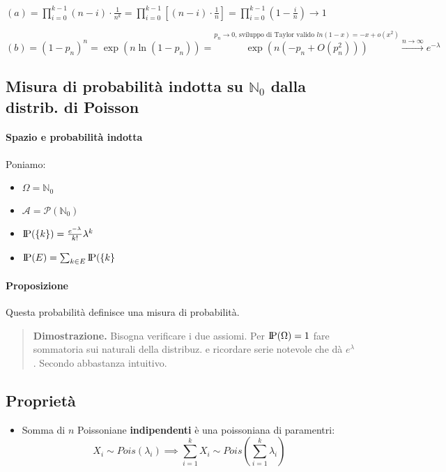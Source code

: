\documentclass[a4paper,10pt]{article}
\newcommand{\pr}{\text{I\kern-0.15em P}} %
\theoremstyle{remark}
\theoremstyle{definition}
\newenvironment{dimo}{\begin{quote}\textbf{Dimostrazione.}}{\end{quote}} %
\begin{document}
$(a)=\prod_{i=0}^{k-1}(n-i) \cdot \frac{1}{n^k}=\prod_{i=0}^{k-1}[(n-i) \cdot \frac{1}{n}]=\prod_{i=0}^{k-1}\left(1-\frac{i}{n}\right)\rightarrow1$

$(b)=\left(1-p_{n}\right)^{n}=\exp\left(n\ln\left(1-p_{n}\right)\right)=\overset{\text{$p_{n}\rightarrow0$, sviluppo di Taylor valido $ln(1-x)=-x+o(x^2)$}}{\exp\left(n\left(-p_{n}+O\left(p_{n}^{2}\right)\right)\right)}\overset{n\rightarrow\infty}{\longrightarrow}e^{-\lambda}$

\subsection*{Misura di probabilità indotta su $\mathbb{N}_0$ dalla distrib. di Poisson}
\paragraph*{Spazio e probabilità indotta}
Poniamo: 
\begin{itemize}
    \item $\Omega=\mathbb{N}_0$
    \item $\mathcal{A}=\mathcal{P}(\mathbb{N}_0)$
    \item $\pr(\{k\})=\frac{e^{-\lambda}}{k!}\lambda^k$    
    \item $\pr(E)=\sum_{k\in E}\pr(\{k\}$
\end{itemize}

\paragraph*{Proposizione} Questa probabilità definisce una misura di probabilità.

\begin{dimo} Bisogna verificare i due assiomi. Per $\pr(\Omega)=1$ fare sommatoria sui naturali della distribuz. e ricordare serie notevole che dà $e^\lambda$. Secondo abbastanza intuitivo.
    
\end{dimo}


\subsection*{Proprietà}
\begin{itemize}
    \item Somma di $n$ Poissoniane \textbf{indipendenti} è una poissoniana di paramentri:
    $$X_i \sim Pois(\lambda_i) \implies \sum_{i=1}^kX_i \sim Pois(\sum_{i=1}^k\lambda_i)$$
\end{itemize}
\end{document}
